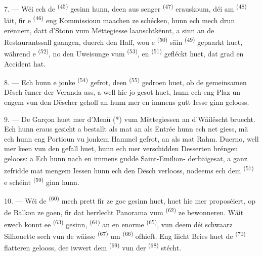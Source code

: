 7. --- Wéi ech de  \textsuperscript{(45)} gesinn hunn, deen aus senger
 \textsuperscript{(47)} erauskoum, déi am 
\textsuperscript{(48)} läit, fir e  \textsuperscript{(46)} eng
Kommissioun maachen ze schécken, hunn ech mech drun erënnert, datt d'Stonn vum
Mëttegiesse laanschtkënnt, a sinn an de Restaurantssall gaangen, duerch den Haff, wou
e  \textsuperscript{(50)} säin  \textsuperscript{(49)}
gepaarkt huet, während e  \textsuperscript{(52)}, no den
Uweisunge vum  \textsuperscript{(53)}, en 
\textsuperscript{(51)} gefléckt huet, dat grad en Accident hat.

8. --- Ech hunn e jonke  \textsuperscript{(54)} gefrot, deen
 \textsuperscript{(55)} gedroen huet, ob de gemeinsamen Dësch
ënner der Veranda ass, a well hie jo gesot huet, hunn ech eng Plaz un engem vun den
Dëscher geholl an hunn mer en immens gutt Iesse ginn gelooss.


\VUsaut{4.0mm}
\VUsaut{3.0mm}

9. --- De Garçon huet mer d'Menü (*) vum Mëttegiessen an d'Wäilëscht bruecht. Ech
hunn eraus gesicht a bestallt als  mat 
an als Entrée   hunn ech net giess,
mä ech hunn eng Portioun  vu jonkem Hammel gefrot, an als
 mat Rahm. Duerno, well mer keen vun den
 gefall huet, hunn ech mer verschidden Desserten bréngen gelooss:
  a  Ech hunn nach en immens gudde
Saint-Emilion- derbäigesat, a ganz zefridde mat mengem Iessen hunn ech
den Dësch verlooss, nodeems ech dem  \textsuperscript{(57)} e schéint
 \textsuperscript{(59)} ginn hunn.

10. --- Wéi de  \textsuperscript{(60)} mech prett fir ze goe gesinn
huet, huet hie mer proposéiert, op de Balkon ze goen, fir dat herrlecht Panorama vum
 \textsuperscript{(62)} ze bewonneren. Wäit ewech konnt ee
 \textsuperscript{(63)} gesinn, 
\textsuperscript{(64)} an en enorme  \textsuperscript{(65)}, vun deem
déi schwaarz Silhouette sech vun de wäisse  \textsuperscript{(67)}
um  \textsuperscript{(66)} ofhieft. Eng liicht Bries huet de
 \textsuperscript{(70)} flatteren gelooss, dee iwwert dem 
\textsuperscript{(69)} vun der  \textsuperscript{(68)} stécht.

